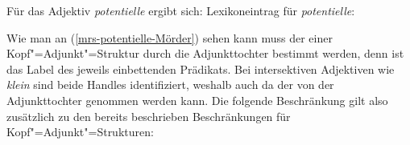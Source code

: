 Für das Adjektiv \emph{potentielle} ergibt sich:
\eas
Lexikoneintrag für \emph{potentielle}:\\
\zs

Wie man an (\ref{mrs-potentielle-Mörder}) sehen kann muss der \ltopw einer Kopf"=Adjunkt"=Struktur
durch die Adjunkttochter bestimmt werden, denn \ltop ist das Label des jeweils einbettenden
Prädikats. Bei intersektiven Adjektiven wie \emph{klein} sind beide Handles identifiziert, weshalb
auch da der \ltopw von der Adjunkttochter genommen werden kann. Die folgende Beschränkung gilt also
zusätzlich zu den bereits beschrieben Beschränkungen für Kopf"=Adjunkt"=Strukturen:
\ea
\label{Beschränkung-Semantik-Kopf-Adjunkt-Strukturen}
 \impl
\z

